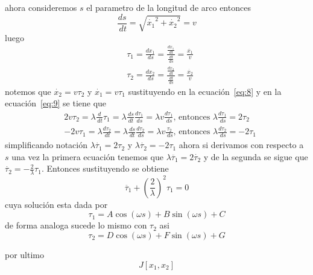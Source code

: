 \documentclass{ejercicios}
\begin{document}
\begin{solution}
ahora consideremos $s$ el parametro de la longitud de arco entonces 
\[\frac{ds}{\,dt} = \sqrt{\dot{x_1}^2 + \dot{x_2}^2} = v\]
luego 
\[
  \begin{aligned}
    & \tau_1 = \frac{dx_1}{\,ds} = \frac{\frac{dx_1}{\,dt}}{\frac{\,dt}{\,ds}} = \frac{\dot{x_1}}{v} \\ 
    & \tau_2 = \frac{dx_2}{\,ds} = \frac{\frac{dx_2}{\,dt}}{\frac{\,dt}{\,ds}} = \frac{\dot{x_2}}{v}
  \end{aligned}
\]
notemos que $\dot{x_2} = v\tau_2$ y $\dot{x_1} = v\tau_1$ sustituyendo en la ecuación~\ref{eq:8} y en la ecuación~\ref{eq:9} se tiene que 
\[\begin{aligned}
  & 2v\tau_2 = \lambda\frac{d}{\,dt}\tau_1 = \lambda\frac{\,ds}{\,dt}\frac{d\tau_1}{\,ds} = \lambda v\frac{d\tau_1}{\,ds} \text{, entonces } \lambda\frac{d\tau_1}{\,ds} = 2\tau_2 \\ 
  & -2v\tau_1 = \lambda\frac{d\tau_2}{\,dt} = \lambda\frac{\,ds}{\,dt}\frac{d\tau_2}{\,ds} = \lambda v\frac{\tau_2}{\,ds}\text{, entonces }\lambda\frac{d\tau_2}{\,ds} = -2\tau_1
\end{aligned}\]
\noindent
simplificando notación $\lambda\dot{\tau_1} = 2\tau_2$ y $\lambda\dot{\tau_2} = -2\tau_1$ ahora si derivamos con respecto a $s$ una vez la primera ecuación tenemos que $\lambda\ddot{\tau_1} = 2\dot{\tau_2}$ y de la segunda se sigue que $\dot{\tau_2} = -\frac{2}{\lambda}\tau_1$.
Entonces sustituyendo se obtiene 
\[\ddot{\tau_1} + \left(\frac{2}{\lambda}\right)^2\tau_1 = 0\]
cuya solución esta dada por 
\[\tau_1 = A\cos(\omega s) + B\sin(\omega s) + C\]
de forma analoga sucede lo mismo con $\tau_2$ asi 
\[\tau_2 = D\cos(\omega s) + F\sin(\omega s) + G\]

por ultimo 
\[J[x_1,x_2]\]
\end{solution}
\end{document}
